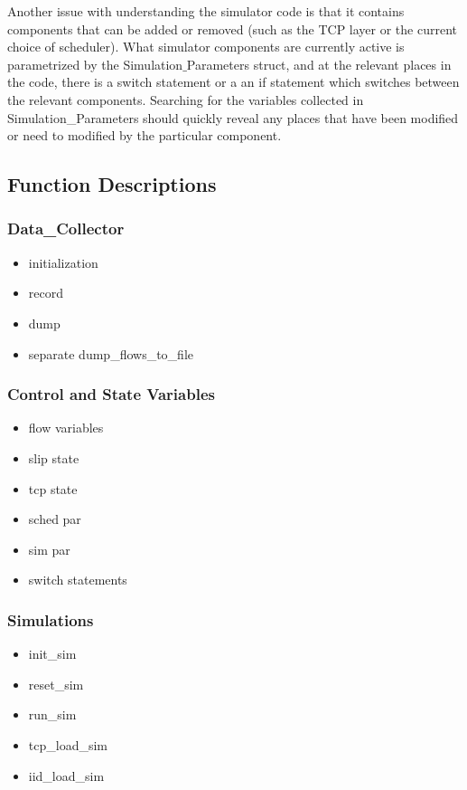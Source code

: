 \documentclass[11pt]{article}%
\begin{document}
Another issue with understanding the simulator code is that it contains components that can be added or removed (such as the TCP layer or the current choice of scheduler).  What simulator components are currently active is parametrized by the Simulation$\_$Parameters struct, and at the relevant places in the code, there is a switch statement or a an if statement which switches between the relevant components.  Searching for the variables collected in Simulation\_Parameters should quickly reveal any places that have been modified or need to modified by the particular component.

\subsection{Function Descriptions}
\subsubsection{Data\_Collector}
\begin{itemize}
\item initialization
\item record
\item dump
\item separate dump\_flows\_to\_file
\end{itemize}

\subsubsection{Control and State Variables}
\begin{itemize}
\item flow variables
\item slip state
\item tcp state
\item sched par
\item sim par
\item switch statements
\end{itemize}

\subsubsection{Simulations}
\begin{itemize}
\item init\_sim
\item reset\_sim
\item run\_sim
\item tcp\_load\_sim
\item iid\_load\_sim
\end{itemize}
\end{document}
